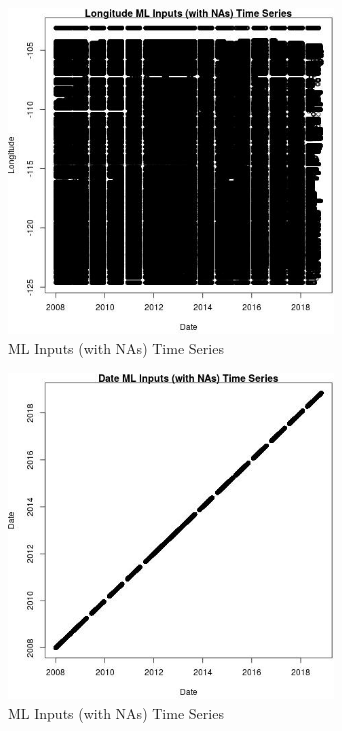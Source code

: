 \begin{figure} 
\centering  
\includegraphics[width=0.77\textwidth]{Code_Outputs/Report_ML_input_PM25_Step4_part_e_de_duplicated_aves_compiled_2019-05-20wNAs_LongitudevDate.jpg} 
\caption{\label{fig:Report_ML_input_PM25_Step4_part_e_de_duplicated_aves_compiled_2019-05-20wNAsLongitudevDate}ML Inputs (with NAs) Time Series} 
\end{figure} 
 

\begin{figure} 
\centering  
\includegraphics[width=0.77\textwidth]{Code_Outputs/Report_ML_input_PM25_Step4_part_e_de_duplicated_aves_compiled_2019-05-20wNAs_DatevDate.jpg} 
\caption{\label{fig:Report_ML_input_PM25_Step4_part_e_de_duplicated_aves_compiled_2019-05-20wNAsDatevDate}ML Inputs (with NAs) Time Series} 
\end{figure} 
 

